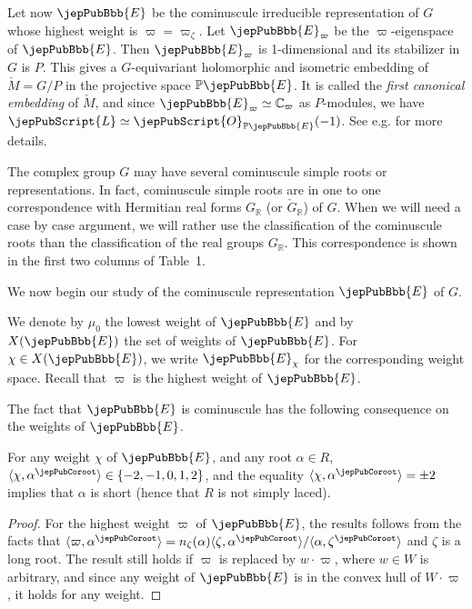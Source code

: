 Let now $\jepPubBbb{E}$ be the cominuscule irreducible representation of $G$ whose highest weight is $\varpi=\varpi_\zeta$. Let $\jepPubBbb{E}_\varpi$ be the $\varpi$-eigenspace of $\jepPubBbb{E}$. Then $\jepPubBbb{E}_\varpi$ is 1-dimensional and its stabilizer in $G$ is $P$. This gives a $G$-equivariant holomorphic and isometric embedding of $\check M=G/P$ in the projective space $\mathbb P\jepPubBbb{E}$. It is called the \emph{first canonical embedding} of $\check M$, and since $\jepPubBbb{E}_\varpi\simeq\mathbb C_\varpi$ as $P$-modules, we have $\jepPubScript{L}\simeq\jepPubScript{O}_{\mathbb P\jepPubBbb{E}}(-1)$. See e.g. \cite{jep93NT76} for more details.

\begin{remark}
The complex group $G$ may have several cominuscule simple roots or representations. In fact, cominuscule simple roots are in one to one correspondence with Hermitian real forms $G_{\mathbb R}$ (or $\check G_{\mathbb R}$) of $G$. When we will need a case by case argument, we will rather use the classification of the cominuscule roots than the classification of the real groups $G_{\mathbb R}$. This correspondence is shown in the first two columns of Table~1.
\end{remark}
We now begin our study of the cominuscule representation $\jepPubBbb{E}$ of $G$.
\begin{notation}
We denote by $\mu_0$ the lowest weight of $\jepPubBbb{E}$ and by $X(\jepPubBbb{E})$ the set of weights of $\jepPubBbb{E}$. For $\chi\in X(\jepPubBbb{E})$, we write $\jepPubBbb{E}_\chi$ for the corresponding weight space. Recall that $\varpi$ is the highest weight of $\jepPubBbb{E}$.
\end{notation}
The fact that $\jepPubBbb{E}$ is cominuscule has the following consequence on the weights of $\jepPubBbb{E}$.
\begin{lemma}
For any weight $\chi$ of $\jepPubBbb{E}$, and any root $\alpha\in R$, $\langle\chi,\alpha^\jepPubCoroot\rangle\in\{-2,-1,0,1,2\}$, and the equality $\langle\chi,\alpha^\jepPubCoroot\rangle=\pm2$ implies that $\alpha$ is short (hence that $R$ is not simply laced).
\end{lemma}
\begin{proof}
For the highest weight $\varpi$ of $\jepPubBbb{E}$, the results follows from the facts that $\langle\varpi,\alpha^\jepPubCoroot\rangle=n_\zeta(\alpha)\langle\zeta,\alpha^\jepPubCoroot\rangle/\langle\alpha,\zeta^\jepPubCoroot\rangle$ and $\zeta$ is a long root. The result still holds if $\varpi$ is replaced by $w\cdot\varpi$, where $w\in W$ is arbitrary, and since any weight of $\jepPubBbb{E}$ is in the convex hull of $W\cdot\varpi$, it holds for any weight.
\end{proof}
